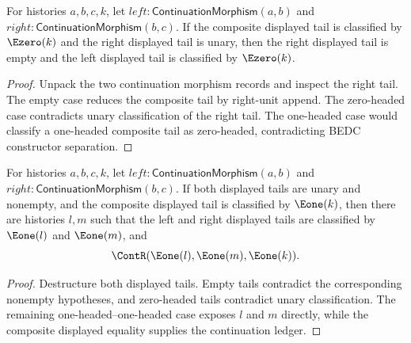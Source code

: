 \begin{theorem}
\label{thm:continuation-morphism-comp-e0-tail-right-cases}
For histories $a,b,c,k$, let
$left:\mathsf{ContinuationMorphism}(a,b)$ and
$right:\mathsf{ContinuationMorphism}(b,c)$. If the composite displayed tail is
classified by $\Ezero(k)$ and the right displayed tail is unary, then the right
displayed tail is empty and the left displayed tail is classified by
$\Ezero(k)$.
\end{theorem}
\begin{proof}
Unpack the two continuation morphism records and inspect the right tail. The
empty case reduces the composite tail by right-unit append. The zero-headed
case contradicts unary classification of the right tail. The one-headed case
would classify a one-headed composite tail as zero-headed, contradicting BEDC
constructor separation.
\end{proof}

\begin{theorem}
\label{thm:continuation-morphism-comp-nonempty-e1-tail-factors}
For histories $a,b,c,k$, let
$left:\mathsf{ContinuationMorphism}(a,b)$ and
$right:\mathsf{ContinuationMorphism}(b,c)$. If both displayed tails are unary
and nonempty, and the composite displayed tail is classified by $\Eone(k)$,
then there are histories $l,m$ such that the left and right displayed tails are
classified by $\Eone(l)$ and $\Eone(m)$, and
$$
\ContR(\Eone(l),\Eone(m),\Eone(k)).
$$
\end{theorem}
\begin{proof}
Destructure both displayed tails. Empty tails contradict the corresponding
nonempty hypotheses, and zero-headed tails contradict unary classification.
The remaining one-headed--one-headed case exposes $l$ and $m$ directly, while
the composite displayed equality supplies the continuation ledger.
\end{proof}

